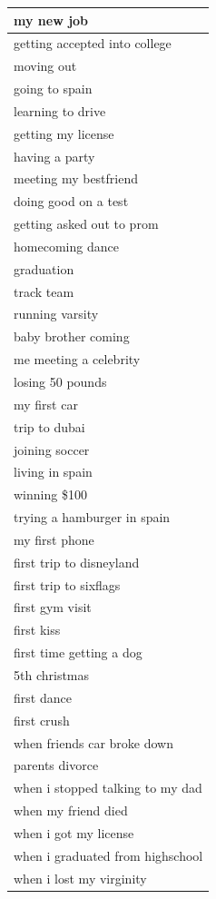 \documentclass[
  .7em,
  letterpaper,
  DIV=11,
  numbers=noendperiod]{scrartcl}
\begin{document}
\begin{table}
\begin{tabular}{l}
my new job\\
\hline
getting accepted into college\\
\hline
moving out\\
\hline
going to spain\\
\hline
learning to drive\\
\hline
getting my license\\
\hline
having a party\\
\hline
meeting my bestfriend\\
\hline
doing good on a test\\
\hline
getting asked out to prom\\
\hline
homecoming dance\\
\hline
graduation\\
\hline
track team\\
\hline
running varsity\\
\hline
baby brother coming\\
\hline
me meeting a celebrity\\
\hline
losing 50 pounds\\
\hline
my first car\\
\hline
trip to dubai\\
\hline
joining soccer\\
\hline
living in spain\\
\hline
winning \$100\\
\hline
trying a hamburger in spain\\
\hline
my first phone\\
\hline
first trip to disneyland\\
\hline
first trip to sixflags\\
\hline
first gym visit\\
\hline
first kiss\\
\hline
first time getting a dog\\
\hline
5th christmas\\
\hline
first dance\\
\hline
first crush\\
\hline
when friends car  broke down\\
\hline
parents divorce\\
\hline
when i stopped talking to my dad\\
\hline
when my friend died\\
\hline
when i got my license\\
\hline
when i graduated from highschool\\
\hline
when i lost my virginity\\

\end{tabular}
\end{table}
\end{document}
